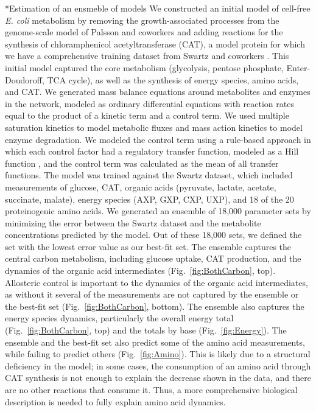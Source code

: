 \documentclass[12pt]{article}
\makeatletter
\renewcommand\subsection{\@startsection
	{subsection}{2}{0mm}
	{-0.05in}
	{-0.5\baselineskip}
	{\normalfont\normalsize\bfseries}}
\makeatother
\begin{document}
\subsection*{Estimation of an ensmeble of models}
We constructed an initial model of cell-free \textit{E. coli} metabolism by removing the growth-associated processes from the genome-scale model of Palsson and coworkers \cite{?} and adding reactions for the synthesis of chloramphenicol acetyltransferase (CAT), a model protein for which we have a comprehensive training dataset from Swartz and coworkers \cite{?}. 
This initial model captured the core metabolism (glycolysis, pentose phosphate, Enter-Doudoroff, TCA cycle), as well as the synthesis of energy species, amino acids, and CAT.
We generated mass balance equations around metabolites and enzymes in the network, modeled as ordinary differential equations with reaction rates equal to the product of a kinetic term and a control term.
We used multiple saturation kinetics to model metabolic fluxes and mass action kinetics to model enzyme degradation.
We modeled the control term using a rule-based approach in which each control factor had a regulatory transfer function, modeled as a Hill function \cite{?}, and the control term was calculated as the mean of all transfer functions.
The model was trained against the Swartz dataset, which included measurements of glucose, CAT, organic acids (pyruvate, lactate, acetate, succinate, malate), energy species (AXP, GXP, CXP, UXP), and 18 of the 20 proteinogenic amino acids.
We generated an ensemble of 18,000 parameter sets by minimizing the error between the Swartz dataset and the metabolite concentrations predicted by the model.
Out of these 18,000 sets, we defined the set with the lowest error value as our best-fit set.
The ensemble captures the central carbon metabolism, including glucose uptake, CAT production, and the dynamics of the organic acid intermediates (Fig.~\ref{fig:BothCarbon}, top).
Allosteric control is important to the dynamics of the organic acid intermediates, as without it several of the measurements are not captured by the ensemble or the best-fit set (Fig.~\ref{fig:BothCarbon}, bottom).
The ensemble also captures the energy species dynamics, particularly the overall energy total (Fig.~\ref{fig:BothCarbon}, top) and the totals by base (Fig.~\ref{fig:Energy}).
The ensemble and the best-fit set also predict some of the amino acid measurements, while failing to predict others (Fig.~\ref{fig:Amino}).
This is likely due to a structural deficiency in the model; in some cases, the consumption of an amino acid through CAT synthesis is not enough to explain the decrease shown in the data, and there are no other reactions that consume it. Thus, a more comprehensive biological description is needed to fully explain amino acid dynamics.
\end{document}
